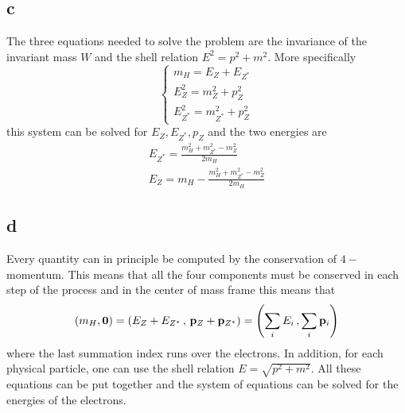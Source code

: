 \subsection*{c}
The three equations needed to solve the problem are the invariance of the invariant mass $W$ and the shell relation $E^2 = p^2 + m^2$. 
More specifically
\begin{equation*}\begin{cases}
    m_H = E_Z + E_{Z^*} \\
    E_Z^2 = m_Z^2 + p_Z^2 \\
    E_{Z^*}^2 = m_{Z^*}^2 + p_Z^2
\end{cases}\end{equation*}
this system can be solved for $E_Z, E_{Z^*}, p_Z$ and the two energies are
\begin{gather*}
    E_{Z^*} = \frac{m_H^2 + m_{Z^*}^2 - m_Z^2}{2m_H} \\
    E_Z = m_H - \frac{m_H^2 + m_{Z^*}^2 - m_Z^2}{2m_H}
\end{gather*}

\subsection*{d}
Every quantity can in principle be computed by the conservation of $4-$momentum. This means that 
all the four components must be conserved in each step of the process and in the center of mass frame this means that
\begin{equation*}
    (m_H, \mathbf{0}) = (E_Z + E_{Z^*} \, , \, \mathbf{p}_Z + \mathbf{p}_{Z^*}) = \left(\sum_i E_i \, , \sum_i \mathbf{p}_i \right)
\end{equation*}
where the last summation index runs over the electrons. In addition, for each physical particle, one can use the shell relation $E = \sqrt{p^2 + m^2}$.
All these equations can be put together and the system of equations can be solved for the energies of the electrons.